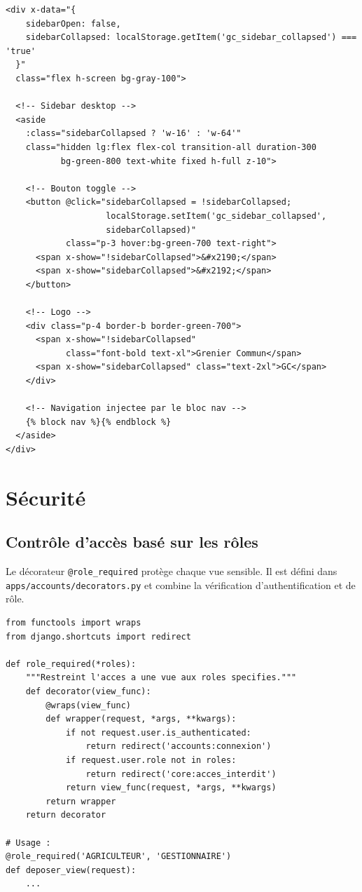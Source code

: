 \documentclass[12pt,a4paper,twoside]{report}
\begin{document}
\begin{lstlisting}[style=htmlstyle, caption={Sidebar rétractable --- \texttt{templates/base.html} (extrait Alpine.js)}]
<div x-data="{
    sidebarOpen: false,
    sidebarCollapsed: localStorage.getItem('gc_sidebar_collapsed') === 'true'
  }"
  class="flex h-screen bg-gray-100">

  <!-- Sidebar desktop -->
  <aside
    :class="sidebarCollapsed ? 'w-16' : 'w-64'"
    class="hidden lg:flex flex-col transition-all duration-300
           bg-green-800 text-white fixed h-full z-10">

    <!-- Bouton toggle -->
    <button @click="sidebarCollapsed = !sidebarCollapsed;
                    localStorage.setItem('gc_sidebar_collapsed',
                    sidebarCollapsed)"
            class="p-3 hover:bg-green-700 text-right">
      <span x-show="!sidebarCollapsed">&#x2190;</span>
      <span x-show="sidebarCollapsed">&#x2192;</span>
    </button>

    <!-- Logo -->
    <div class="p-4 border-b border-green-700">
      <span x-show="!sidebarCollapsed"
            class="font-bold text-xl">Grenier Commun</span>
      <span x-show="sidebarCollapsed" class="text-2xl">GC</span>
    </div>

    <!-- Navigation injectee par le bloc nav -->
    {% block nav %}{% endblock %}
  </aside>
</div>
\end{lstlisting}

\section{Sécurité}

\subsection{Contrôle d'accès basé sur les rôles}

Le décorateur \texttt{@role\_required} protège chaque vue sensible.
Il est défini dans \texttt{apps/accounts/decorators.py} et combine
la vérification d'authentification et de rôle.

\begin{lstlisting}[style=pythonstyle, caption={Décorateur \texttt{role\_required()} --- \texttt{apps/accounts/decorators.py}}]
from functools import wraps
from django.shortcuts import redirect

def role_required(*roles):
    """Restreint l'acces a une vue aux roles specifies."""
    def decorator(view_func):
        @wraps(view_func)
        def wrapper(request, *args, **kwargs):
            if not request.user.is_authenticated:
                return redirect('accounts:connexion')
            if request.user.role not in roles:
                return redirect('core:acces_interdit')
            return view_func(request, *args, **kwargs)
        return wrapper
    return decorator

# Usage :
@role_required('AGRICULTEUR', 'GESTIONNAIRE')
def deposer_view(request):
    ...
\end{lstlisting}
\end{document}
